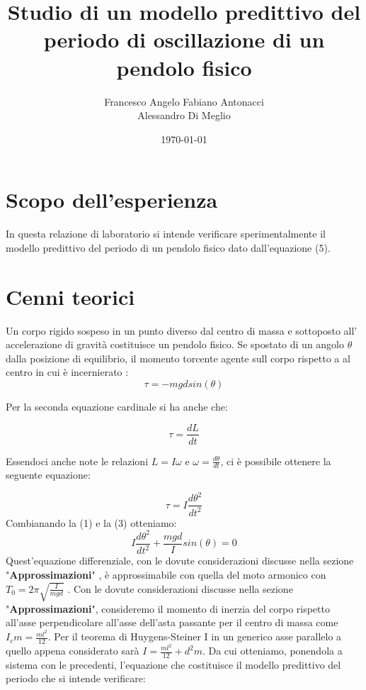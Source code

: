 \documentclass[11pt]{article}
\title{Studio di un modello predittivo del periodo di oscillazione di un pendolo fisico}
\author{Francesco Angelo Fabiano Antonacci\\Alessandro Di Meglio}
\date{\today}
\begin{document}
\maketitle

\section{Scopo dell'esperienza}

In questa relazione di laboratorio si intende verificare sperimentalmente il modello predittivo del periodo di un pendolo fisico dato dall'equazione (5).

\section{Cenni teorici}

Un corpo rigido sospeso in un punto diverso dal centro di massa e sottoposto all' accelerazione di gravità costituisce un pendolo fisico.
Se spostato di un angolo $\theta$ dalla posizione di equilibrio, il momento torcente agente sull corpo rispetto a al centro in cui è incernierato :
\begin{equation}
\tau  = -mgd sin(\theta)
\end{equation}

Per la seconda equazione cardinale si ha anche che:


\begin{equation}
\tau  =\frac{dL}{dt}
\end{equation}

Essendoci anche note le relazioni $L=I\omega  $ e $\omega=\frac{d\theta}{dt}$, ci è possibile ottenere la seguente equazione:

\begin{equation}
\tau=I\frac{d\theta^2}{dt^2}
\end{equation}
Combianando la (1) e la (3) otteniamo:
\begin{equation}
I\frac{d\theta^2}{dt^2}+\frac{mgd}{I}sin(\theta)=0
\end{equation}
Quest'equazione differenziale, con le dovute considerazioni discusse nella sezione "\textbf {Approssimazioni}" , è approssimabile con quella del moto armonico con $T_0=2\pi\sqrt{\frac{I}{mgd}}$ .
Con le dovute considerazioni discusse nella sezione "\textbf {Approssimazioni}", consideremo il momento di inerzia del corpo rispetto all'asse perpendicolare all'asse dell'asta passante per il centro di massa come $I_cm=\frac{ml^2}{12}$.
Per il teorema di Huygens-Steiner I in un generico asse parallelo a quello appena considerato sarà $I=\frac{ml^2}{12}+d^2m$.
Da cui otteniamo, ponendola a sistema con le precedenti, l'equazione che costituisce il modello predittivo del periodo che si intende verificare:
\end{document}
